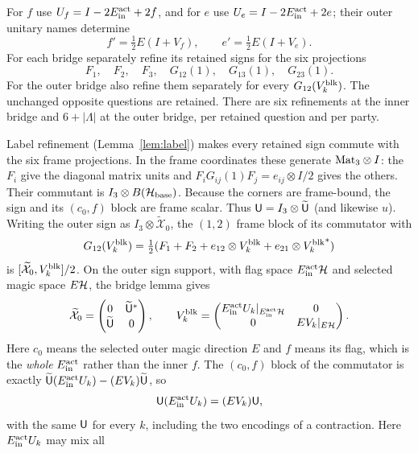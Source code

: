 For $f$ use $U_f=I-2{E^{\rm act}_{\rm in}}+2f$, and for $e$ use
$U_e=I-2{E^{\rm act}_{\rm in}}+2e$; their outer unitary names determine
\[
 f'=\tfrac12 E(I+V_f),\qquad e'=\tfrac12 E(I+V_e).
\]
For each bridge separately refine its retained signs for the six projections
\[
 F_1,\quad F_2,\quad F_3,\quad G_{12}(1),\quad G_{13}(1),\quad G_{23}(1).
\]
For the outer bridge also refine them separately for every $G_{12}({V^{\rm blk}_k})$.
The unchanged opposite questions are retained. There are six refinements at the inner bridge and $6+|\Lambda|$ at
the outer bridge, per retained question and per party.

Label refinement (Lemma~\ref{lem:label}) makes every
retained sign commute with the six frame projections. In the frame
coordinates these generate $\mathrm{Mat}_3\otimes I$: the $F_i$ give the diagonal
matrix units and $F_iG_{ij}(1)F_j=e_{ij}\otimes I/2$ gives the
others. Their commutant is $I_3\otimes B(\mathcal H_{\rm base})$.
Because the corners are frame-bound, the sign and its $(c_0,f)$ block
are frame scalar. Thus ${\mathsf U}=I_3\otimes\widetilde {\mathsf U}$ (and likewise $u$).
Writing the outer sign as $I_3\otimes\widetilde{\mathcal X}_0$,
the $(1,2)$ frame block of its commutator with
\[
 G_{12}({V^{\rm blk}_k})=\tfrac12(F_1+F_2+e_{12}\otimes {V^{\rm blk}_k}+
                                      e_{21}\otimes {V^{\rm blk}_k}^*)
\]
is $[\widetilde{\mathcal X}_0,{V^{\rm blk}_k}]/2$. On the outer sign support,
with flag space ${E^{\rm act}_{\rm in}}\mathcal H$ and selected magic space $E\mathcal H$, the bridge
lemma gives
\[
 \widetilde{\mathcal X}_0=
 \begin{pmatrix}0&\widetilde {\mathsf U}^*\\\widetilde {\mathsf U}&0\end{pmatrix},
 \qquad
 {V^{\rm blk}_k}=\begin{pmatrix}E^{\rm act}_{\rm in}U_k|_{{E^{\rm act}_{\rm in}}\mathcal H}&0\\0&EV_k|_{E\mathcal H}\end{pmatrix}.
\]
Here $c_0$ means the selected outer magic direction $E$ and $f$
means its flag, which is the \emph{whole} ${E^{\rm act}_{\rm in}}$ rather than the inner $f$.
The $(c_0,f)$ block of the commutator is exactly
$\widetilde {\mathsf U}(E^{\rm act}_{\rm in}U_k)-(EV_k)\widetilde {\mathsf U}$, so
\begin{equation}
                 {\mathsf U}(E^{\rm act}_{\rm in}U_k)=(EV_k){\mathsf U},                            \label{eq:nested-N5}
\end{equation}
with the same ${\mathsf U}$ for every $k$, including the two
encodings of a contraction. Here $E^{\rm act}_{\rm in}U_k$ may mix all

